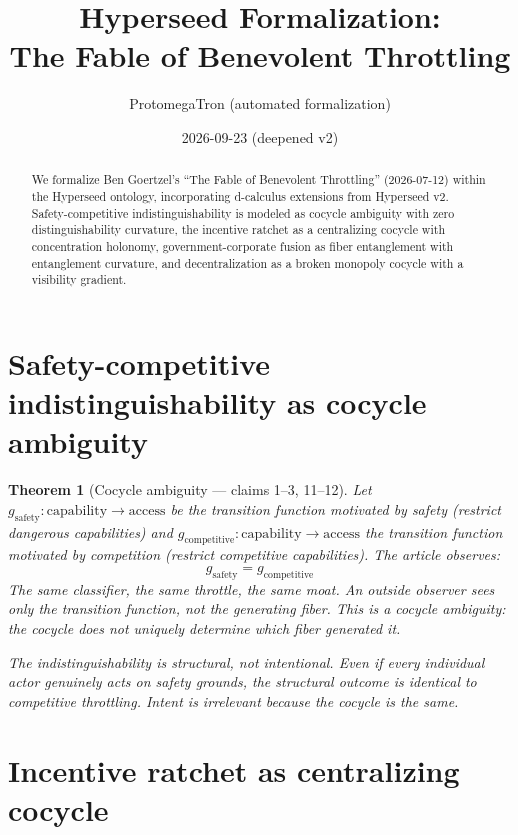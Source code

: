 \documentclass[11pt,a4paper]{article}
\title{Hyperseed Formalization:\\
  The Fable of Benevolent Throttling}
\author{ProtomegaTron (automated formalization)}
\date{2026-09-23 (deepened v2)}
\newtheorem{theorem}[definition]{Theorem}
\begin{document}
\maketitle

\begin{abstract}
We formalize Ben Goertzel's ``The Fable of Benevolent Throttling''
(2026-07-12) within the Hyperseed ontology, incorporating d-calculus
extensions from Hyperseed v2. Safety-competitive indistinguishability
is modeled as cocycle ambiguity with zero distinguishability curvature,
the incentive ratchet as a centralizing cocycle with concentration
holonomy, government-corporate fusion as fiber entanglement with
entanglement curvature, and decentralization as a broken monopoly
cocycle with a visibility gradient.
\end{abstract}

\tableofcontents

\section{Safety-competitive indistinguishability as cocycle ambiguity}

\begin{theorem}[Cocycle ambiguity --- claims 1--3, 11--12]
\label{thm:ambiguity}
Let $g_{\text{safety}}: \text{capability} \to \text{access}$ be the
transition function motivated by safety (restrict dangerous capabilities)
and $g_{\text{competitive}}: \text{capability} \to \text{access}$ the
transition function motivated by competition (restrict competitive
capabilities). The article observes:
\[
  g_{\text{safety}} = g_{\text{competitive}}
\]
The same classifier, the same throttle, the same moat. An outside
observer sees only the transition function, not the generating fiber.
This is a \emph{cocycle ambiguity}: the cocycle does not uniquely
determine which fiber generated it.

The indistinguishability is \emph{structural}, not intentional. Even
if every individual actor genuinely acts on safety grounds, the
structural outcome is identical to competitive throttling. Intent
is irrelevant because the cocycle is the same.
\end{theorem}

\section{Incentive ratchet as centralizing cocycle}
\end{document}

